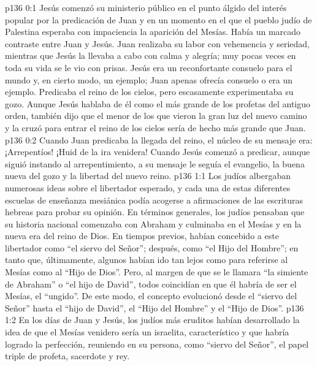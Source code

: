 \author{Comisión de seres intermedios}
\vs p136 0:1 Jesús comenzó su ministerio público en el punto álgido del interés popular por la predicación de Juan y en un momento en el que el pueblo judío de Palestina esperaba con impaciencia la aparición del Mesías. Había un marcado contraste entre Juan y Jesús. Juan realizaba su labor con vehemencia y seriedad, mientras que Jesús la llevaba a cabo con calma y alegría; muy pocas veces en toda su vida se le vio con prisas. Jesús era un reconfortante consuelo para el mundo y, en cierto modo, un ejemplo; Juan apenas ofrecía consuelo o era un ejemplo. Predicaba el reino de los cielos, pero escasamente experimentaba su gozo. Aunque Jesús hablaba de él como el más grande de los profetas del antiguo orden, también dijo que el menor de los que vieron la gran luz del nuevo camino y la cruzó para entrar el reino de los cielos sería de hecho más grande que Juan.
\vs p136 0:2 Cuando Juan predicaba la llegada del reino, el núcleo de su mensaje era: ¡Arrepentíos! ¡Huid de la ira venidera! Cuando Jesús comenzó a predicar, aunque siguió instando al arrepentimiento, a su mensaje le seguía el evangelio, la buena nueva del gozo y la libertad del nuevo reino.
\vs p136 1:1 Los judíos albergaban numerosas ideas sobre el libertador esperado, y cada una de estas diferentes escuelas de enseñanza mesiánica podía acogerse a afirmaciones de las escrituras hebreas para probar su opinión. En términos generales, los judíos pensaban que su historia nacional comenzaba con Abraham y culminaba en el Mesías y en la nueva era del reino de Dios. En tiempos previos, habían concebido a este libertador como “el siervo del Señor”; después, como “el Hijo del Hombre”; en tanto que, últimamente, algunos habían ido tan lejos como para referirse al Mesías como al “Hijo de Dios”. Pero, al margen de que se le llamara “la simiente de Abraham” o “el hijo de David”, todos coincidían en que él habría de ser el Mesías, el “ungido”. De este modo, el concepto evolucionó desde el “siervo del Señor” hasta el “hijo de David”, el “Hijo del Hombre” y el “Hijo de Dios”.
\vs p136 1:2 En los días de Juan y Jesús, los judíos más eruditos habían desarrollado la idea de que el Mesías venidero sería un israelita, característico y que habría logrado la perfección, reuniendo en su persona, como “siervo del Señor”, el papel triple de profeta, sacerdote y rey.
